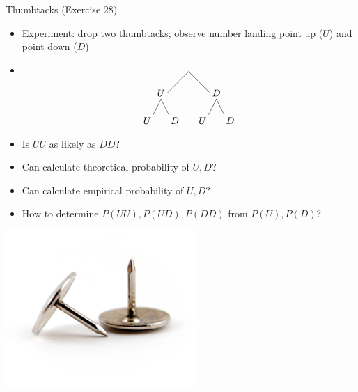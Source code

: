 \documentclass[handout]{beamer}
\theoremstyle{definition}
\begin{document}
\begin{frame}{Thumbtacks (Exercise 28)}
\begin{multicols}{2}
\begin{itemize}
\item Experiment: drop two thumbtacks; observe number
landing point up ($U$) and point down ($D$)
\item
\[\begin{xy}<1cm,0cm>:
(0,0)="0";
(-1,-1)="1";
(1,-1)="2";
"0";"1"*+!D{U}**\dir{-};
"0";"2"*+!D{D}**\dir{-};
"1";(-1.5,-2)*+!D{U}**\dir{-};
"1";(-.5,-2)*+!D{D}**\dir{-};
"2";(.5,-2)*+!D{U}**\dir{-};
"2";(1.5,-2)*+!D{D}**\dir{-};
\end{xy}\]
\item Is $UU$ as likely as $DD$?
\item Can calculate theoretical probability of $U,D$?
\item Can calculate empirical probability of $U,D$?
\item How to determine $P\left(UU\right),P\left(UD\right),
P\left(DD\right)$
from $P\left(U\right),P\left(D\right)$?
\end{itemize}
\includegraphics[scale=.5]{Thumbtacks}
\end{multicols}
\end{frame}
\end{document}
